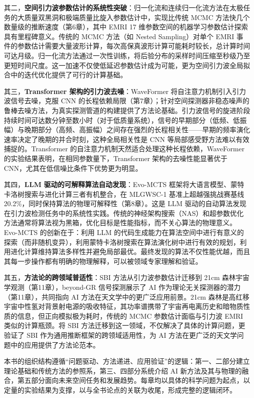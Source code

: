 其二，\textbf{空间引力波参数估计的系统性突破}：归一化流和连续归一化流方法在太极任务的大质量双黑洞和极端质量比旋入参数估计中，实现比传统 MCMC 方法快几个数量级的推断速度（第6章），其中 EMRI 17 维参数空间的机器学习参数估计探索具有里程碑意义。传统的 MCMC 方法（如 Nested Sampling）对单个 EMRI 事件的参数估计需要大量波形计算，每次高保真波形计算可能耗时较长，总计算时间可达月级。归一化流方法通过一次性训练，将后验分布的采样时间压缩至秒级乃至更短时间尺度。这一加速不仅使低延迟参数估计成为可能，更为空间引力波全局拟合中的迭代优化提供了可行的计算基础。

其三，\textbf{Transformer 架构的引力波去噪}：WaveFormer 将自注意力机制引入引力波信号去噪，克服 CNN 的长程依赖局限（第7章）；针对空间探测器非稳态噪声的鲁棒去噪方法，为真实探测管道的构建提供了方法论基础。引力波信号的旋进阶段持续时间可达数分钟至数小时（对于低质量系统），信号的早期部分（低频、低振幅）与晚期部分（高频、高振幅）之间存在强烈的长程相关性——早期的频率演化速率决定了晚期的并合时刻，这种全局相关性是 CNN 等局部感受野方法难以有效捕捉的。Transformer 的自注意力机制天然适合处理这种长程依赖，WaveFormer 的实验结果表明，在相同参数量下，Transformer 架构的去噪性能显著优于 CNN，尤其在低信噪比条件下优势更为明显。

其四，\textbf{LLM 驱动的可解释算法自动发现}：Evo-MCTS 框架将大语言模型、蒙特卡洛树搜索与进化计算三者有机整合，在 MLGWSC-1 基准上超越强挑战赛基线 20.2\%，同时保持算法的物理可解释性（第8章）。这是 LLM 驱动的自动算法发现在引力波检测任务中的系统性实践。传统的神经架构搜索（NAS）和超参数优化方法通常将算法视为黑箱，优化目标是性能指标，而不关心算法的物理意义。Evo-MCTS 的创新在于：利用 LLM 的代码生成能力在算法空间中进行有意义的探索（而非随机变异），利用蒙特卡洛树搜索在算法演化树中进行有效的规划，利用进化计算维持算法多样性并避免局部最优。最终发现的算法不仅性能优越，而且其每一步操作都有明确的物理解释，可以被领域专家理解和验证。

其五，\textbf{方法论的跨领域普适性}：SBI 方法从引力波参数估计迁移到 21cm 森林宇宙学观测（第11章），beyond-GR 信号探测展示了 AI 作为理论无关探测器的潜力（第11章），共同指向 AI 方法在天文学中的更广泛应用前景。21cm 森林是高红移宇宙中性氢对背景射电源的吸收特征，其功率谱携带了宇宙再电离历史和暗物质性质的信息，但正向模拟极为耗时，传统的 MCMC 参数估计面临与引力波 EMRI 类似的计算瓶颈。将 SBI 方法迁移到这一领域，不仅解决了具体的计算问题，更验证了 SBI 作为通用推断框架的跨领域适用性，为 AI 方法在更广泛的天文学问题中的应用提供了方法论范本。

本书的组织结构遵循“问题驱动、方法递进、应用验证”的逻辑：第一、二部分建立理论基础和传统方法的参照系，第三、四部分系统介绍 AI 新方法及其与物理的融合，第五部分面向未来空间任务和发展趋势。每章均以具体的科学问题为起点，以定量的实验结果为支撑，以与全书论点的关联为收尾，形成完整的逻辑闭环。

